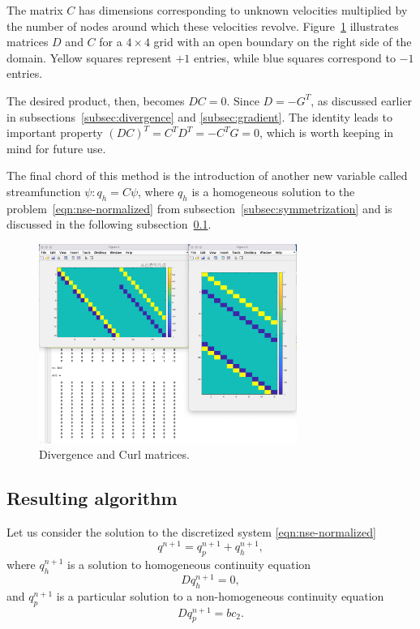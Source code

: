 \documentclass{article}
\begin{document}
The matrix $C$ has dimensions corresponding to unknown velocities multiplied by the number of nodes around which these velocities revolve. Figure~\ref{fig:DC} illustrates matrices $D$ and $C$ for a $4\times4$ grid with an open boundary on the right side of the domain. Yellow squares represent $+1$ entries, while blue squares correspond to $-1$ entries.

The desired product, then, becomes $DC=0$. Since $D=-G^T$, as discussed earlier in subsections~\ref{subsec:divergence} and \ref{subsec:gradient}. The identity leads to important property $(DC)^T=C^TD^T=-C^TG=0$, which is worth keeping in mind for future use.

The final chord of this method is the introduction of another new variable called streamfunction $\psi:q_h=C\psi$, where $q_h$ is a homogeneous solution to the problem~\eqref{eqn:nse-normalized} from subsection~\ref{subsec:symmetrization} and is discussed in the following subsection~\ref{sec:algorithm}.

\begin{figure}
\begin{center}
  \includegraphics[width=0.75\textwidth]{Figures/D-C-DC}
\end{center}
\caption{Divergence and Curl matrices.}
\label{fig:DC}
\end{figure}


\subsection{Resulting algorithm}\label{sec:algorithm}

Let us consider the solution to the discretized system \eqref{eqn:nse-normalized}
\begin{equation}
	q^{n+1}=q^{n+1}_p+q^{n+1}_h,
\end{equation}
where $q^{n+1}_h$ is a solution to homogeneous continuity equation 
\begin{equation}\label{eqn:discrete-homogeneous-continuity}
	Dq^{n+1}_h=0,
\end{equation}
and $q^{n+1}_p$ is a particular solution to a non-homogeneous continuity equation
\begin{equation}\label{eqn:discrete-non-homogeneous-continuity}
	Dq^{n+1}_p=bc_2.
\end{equation}
\end{document}
